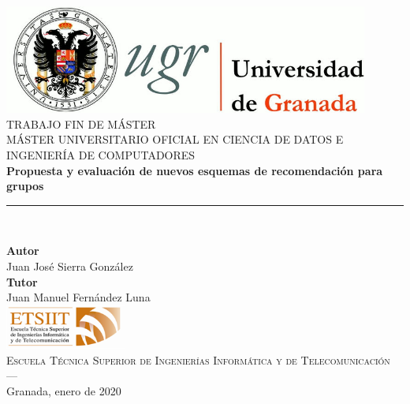 \begin{titlepage}
 
 
\newlength{\centeroffset}
\setlength{\centeroffset}{-0.5\oddsidemargin}
\addtolength{\centeroffset}{0.5\evensidemargin}
\thispagestyle{empty}

\noindent\hspace*{\centeroffset}\begin{minipage}{\textwidth}

\centering
\includegraphics[width=0.9\textwidth]{imagenes/logo_ugr.jpg}\\[1.4cm]

\textsc{ \Large TRABAJO FIN DE MÁSTER\\[0.2cm]}
\textsc{MÁSTER UNIVERSITARIO OFICIAL EN CIENCIA DE DATOS E INGENIERÍA DE COMPUTADORES}\\[1cm]
% 
{\Huge\bfseries Propuesta y evaluación de nuevos esquemas de recomendación para grupos\\
}
\noindent\rule[-1ex]{\textwidth}{2pt}\\[3.5ex]
\end{minipage}

\vspace{2cm}
\noindent\hspace*{\centeroffset}\begin{minipage}{\textwidth}
\centering

\textbf{Autor}\\ {Juan José Sierra González}\\[2.5ex]
\textbf{Tutor}\\
{Juan Manuel Fernández Luna}\\[2cm]
\includegraphics[width=0.3\textwidth]{imagenes/etsiit_logo.png}\\[0.1cm]
\textsc{Escuela Técnica Superior de Ingenierías Informática y de Telecomunicación}\\
\textsc{---}\\
Granada, enero de 2020
\end{minipage}
\end{titlepage}


